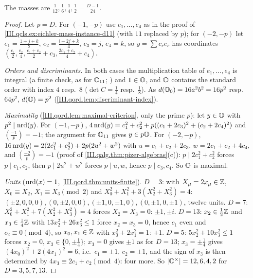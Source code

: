\begin{example}[$D=3,5,7,13$; stretch]
\end{example}
\noindent The masses are $\frac1{12},\frac16,\frac14,\frac12=\frac{D-1}{24}$.
\begin{proof}
Let $p=D$. For $(-1,-p)$ use $e_1,\dots,e_4$ as in the proof of \cref{III.qcls.ex:eichler-mass-instance-d11} (with $11$ replaced by $p$); for $(-2,-p)$ let
$e_1=\frac{1+j+k}2$, $e_2=\frac{i+2j+k}4$, $e_3=j$, $e_4=k$, so $y=\sum c_re_r$ has coordinates $(\frac{c_1}2,\frac{c_2}4,\frac{c_1+c_2}2+c_3,\frac{2c_1+c_2}4+c_4)$.

\emph{Orders and discriminants.} In both cases the multiplication table of $e_1,\dots,e_4$ is integral (a finite check, as for $\mathbb{O}_{11}$; \cite[pp.~341--342]{Piz})
and $1\in\mathbb{O}$, and $\mathbb{O}$ contains the standard order with index $4$ resp.\ $8$ ($\det C=\frac14$ resp.\ $\frac18$). As $d(\mathbb{O}_0)=16a^2b^2=16p^2$ resp.\
$64p^2$, $d(\mathbb{O})=p^2$ (\cref{III.qord.lem:discriminant-index}).

\emph{Maximality} (\cref{III.qord.lem:maximal-criterion}, only the prime $p$): let $y\in\mathbb{O}$ with $p^2\mid\operatorname{nrd}(y)$. For $(-1,-p)$,
$4\operatorname{nrd}(y)=c_1^2+c_2^2+p((c_1+2c_3)^2+(c_2+2c_4)^2)$ and $(\frac{-1}p)=-1$; the argument for $\mathbb{O}_{11}$ gives $y\in p\mathbb{O}$. For $(-2,-p)$,
$16\operatorname{nrd}(y)=2(2c_1^2+c_2^2)+2p(2u^2+w^2)$ with $u=c_1+c_2+2c_3$, $w=2c_1+c_2+4c_4$, and $(\frac{-2}p)=-1$ (proof of \cref{III.qalg.thm:pizer-algebras}(c)): $p\mid2c_1^2+c_2^2$
forces $p\mid c_1,c_2$, then $p\mid2u^2+w^2$ forces $p\mid u,w$, hence $p\mid c_3,c_4$. So $\mathbb{O}$ is maximal.

\emph{Units} ($\operatorname{nrd}(x)=1$, \cref{III.qord.thm:units-finite}). $D=3$: with $X_\mu=2x_\mu\in\mathbb{Z}$, $X_0\equiv X_2$, $X_1\equiv X_3\pmod2$ and $X_0^2+X_1^2+3(X_2^2+X_3^2)=4$:
$(\pm2,0,0,0),(0,\pm2,0,0),(\pm1,0,\pm1,0),(0,\pm1,0,\pm1)$, twelve units. $D=7$: $X_0^2+X_1^2+7(X_2^2+X_3^2)=4$ forces $X_2=X_3=0$: $\pm1,\pm i$.
$D=13$: $x_2\in\frac12\mathbb{Z}$ and $x_3\in\frac14\mathbb{Z}$ with $13x_2^2+26x_3^2\le1$ force $x_2=x_3=0$, hence $c_1$ even and $c_2\equiv0\pmod4$, so $x_0,x_1\in\mathbb{Z}$ with
$x_0^2+2x_1^2=1$: $\pm1$. $D=5$: $5x_2^2+10x_3^2\le1$ forces $x_2=0$, $x_3\in\{0,\pm\frac14\}$; $x_3=0$ gives $\pm1$ as for $D=13$; $x_3=\pm\frac14$ gives
$(4x_0)^2+2(4x_1)^2=6$, i.e.\ $c_1=\pm1$, $c_2=\pm1$, and the sign of $x_3$ is then determined by $4x_3\equiv2c_1+c_2\pmod 4$: four more. So
$\lvert\mathbb{O}^\times\rvert=12,6,4,2$ for $D=3,5,7,13$.


\end{proof}
